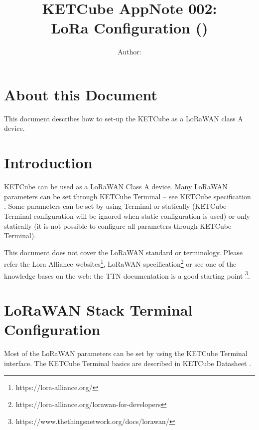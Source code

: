 \documentclass[twoside,a4paper]{refart}
\title{\UWBLogo KETCube AppNote 002:\\ LoRa Configuration (\vhCurrentVersion)}
\author{Author: \vhListAllAuthors}
\begin{document}

\titlepage
\maketitle

\section*{About this Document}


This document describes how to set-up the KETCube as a LoRaWAN class A device.


\setcounter{tocdepth}{1}
\tableofcontents
\clearpage

\listoffigures
\listoftables
\begin{versionhistory}
\end{versionhistory}
\setcounter{table}{0}

\clearpage 
{} 
\pagestyle{headings} 

\clearpage
\clearpage
\section{Introduction}
  KETCube can be used as a LoRaWAN Class A device. Many LoRaWAN parameters can be set through KETCube Terminal -- see KETCube specification \cite{ZCU:KETCube:05-2018}. Some parameters can be set by using Terminal or statically (KETCube Terminal configuration will be ignored when static configuration is used) or only statically (it is not possible to configure all parameters through KETCube Terminal).

  This document does not cover the LoRaWAN standard or terminology. Please refer the Lora Alliance websites\footnote{https://lora-alliance.org/}, LoRaWAN specification\footnote{https://lora-alliance.org/lorawan-for-developers} or see one of the knowledge bases on the web: the TTN documentation is a good starting point \footnote{https://www.thethingsnetwork.org/docs/lorawan/}.
  
\clearpage

\section{LoRaWAN Stack Terminal Configuration}
Most of the LoRaWAN parameters can be set by using the KETCube Terminal interface. The KETCube Terminal basics are described in KETCube Datasheet \cite{ZCU:KETCube:05-2018}.
\end{document}
